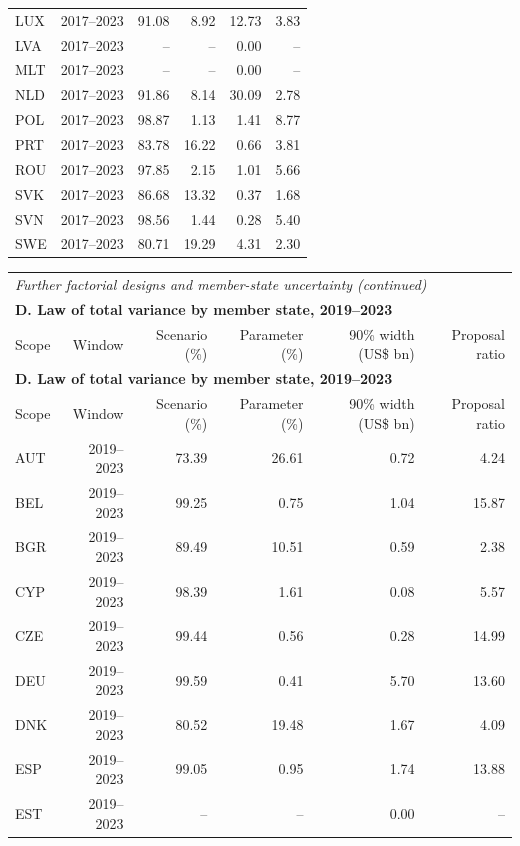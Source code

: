 {\begin{longtable}{@{}lrrrrr@{}}
LUX & 2017–2023 & 91.08 &  8.92 & 12.73 &  3.83 \\
LVA & 2017–2023 & -- & -- &  0.00 & -- \\
MLT & 2017–2023 & -- & -- &  0.00 & -- \\
NLD & 2017–2023 & 91.86 &  8.14 & 30.09 &  2.78 \\
POL & 2017–2023 & 98.87 &  1.13 &  1.41 &  8.77 \\
PRT & 2017–2023 & 83.78 & 16.22 &  0.66 &  3.81 \\
ROU & 2017–2023 & 97.85 &  2.15 &  1.01 &  5.66 \\
SVK & 2017–2023 & 86.68 & 13.32 &  0.37 &  1.68 \\
SVN & 2017–2023 & 98.56 &  1.44 &  0.28 &  5.40 \\
SWE & 2017–2023 & 80.71 & 19.29 &  4.31 &  2.30 \\
\end{longtable}
\addtocounter{table}{-1}
\begin{longtable}{@{}lrrrrr@{}}
\multicolumn{6}{l}{\textit{Further factorial designs and member-state uncertainty (continued)}} \\
\multicolumn{6}{l}{\textbf{D. Law of total variance by member state, 2019–2023}} \\
\toprule
Scope & Window & Scenario (\%) & Parameter (\%) & 90\% width (US\$ bn) & Proposal ratio \\
\midrule
\endfirsthead
\multicolumn{6}{l}{\textbf{D. Law of total variance by member state, 2019–2023}} \\
\toprule
Scope & Window & Scenario (\%) & Parameter (\%) & 90\% width (US\$ bn) & Proposal ratio \\
\midrule
\endhead
\midrule
\endfoot
\bottomrule
\endlastfoot
AUT & 2019–2023 & 73.39 & 26.61 &  0.72 &  4.24 \\
BEL & 2019–2023 & 99.25 &  0.75 &  1.04 & 15.87 \\
BGR & 2019–2023 & 89.49 & 10.51 &  0.59 &  2.38 \\
CYP & 2019–2023 & 98.39 &  1.61 &  0.08 &  5.57 \\
CZE & 2019–2023 & 99.44 &  0.56 &  0.28 & 14.99 \\
DEU & 2019–2023 & 99.59 &  0.41 &  5.70 & 13.60 \\
DNK & 2019–2023 & 80.52 & 19.48 &  1.67 &  4.09 \\
ESP & 2019–2023 & 99.05 &  0.95 &  1.74 & 13.88 \\
EST & 2019–2023 & -- & -- &  0.00 & -- \\

\end{longtable}}
